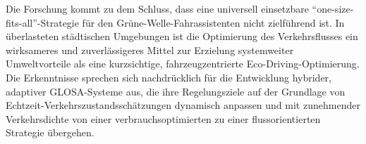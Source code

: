 \mynewline
Die Forschung kommt zu dem Schluss, dass eine universell einsetzbare \enquote{one-size-fits-all}-Strategie für den Grüne-Welle-Fahrassistenten nicht zielführend ist. In überlasteten städtischen Umgebungen ist die Optimierung des Verkehrsflusses ein wirksameres und zuverlässigeres Mittel zur Erzielung systemweiter Umweltvorteile als eine kurzsichtige, fahrzeugzentrierte Eco-Driving-Optimierung. Die Erkenntnisse sprechen sich nachdrücklich für die Entwicklung hybrider, adaptiver GLOSA-Systeme aus, die ihre Regelungsziele auf der Grundlage von Echtzeit-Verkehrszustandsschätzungen dynamisch anpassen und mit zunehmender Verkehrsdichte von einer verbrauchsoptimierten zu einer flussorientierten Strategie übergehen.
